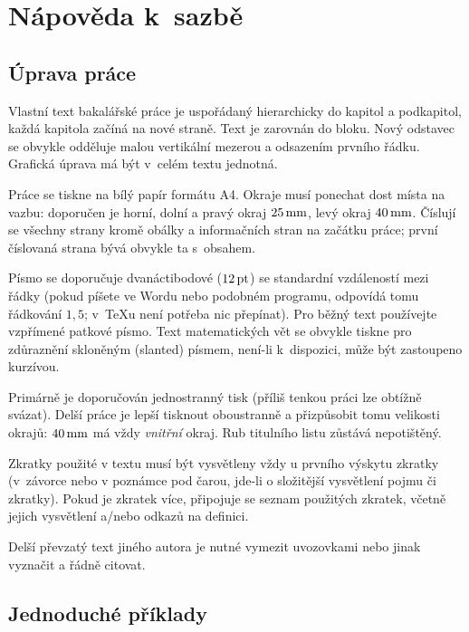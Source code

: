 
\newcommand{\uv}[1]{uvozovky #1 uvozovky}
\chapter{Nápověda k~sazbě}

\section{Úprava práce}

Vlastní text bakalářské práce je uspořádaný hierarchicky do kapitol a podkapitol,
každá kapitola začíná na nové straně. Text je zarovnán do bloku. Nový odstavec
se obvykle odděluje malou vertikální mezerou a odsazením prvního řádku. Grafická
úprava má být v~celém textu jednotná.

Práce se tiskne na bílý papír formátu A4. Okraje musí ponechat dost místa na vazbu:
doporučen je horní, dolní a pravý okraj $25\,\rm mm$, levý okraj $40\,\rm mm$.
Číslují se všechny strany kromě obálky a informačních stran na začátku práce;
první číslovaná strana bývá obvykle ta s~obsahem.

Písmo se doporučuje dvanáctibodové ($12\,\rm pt$) se standardní vzdáleností mezi řádky
(pokud píšete ve Wordu nebo podobném programu, odpovídá tomu řádkování $1,5$; v~\TeX{}u
není potřeba nic přepínat). Pro běžný text používejte vzpřímené patkové písmo.
Text matematických vět se obvykle tiskne pro zdůraznění skloněným (slanted) písmem,
není-li k~dispozici, může být zastoupeno kurzívou.

Primárně je doporučován jednostranný tisk (příliš tenkou práci lze obtížně svázat).
Delší práce je lepší tisknout oboustranně a přizpůsobit tomu velikosti okrajů:
$40\,\rm mm$ má vždy \emph{vnitřní} okraj. Rub titulního listu zůstává nepotištěný.

Zkratky použité v textu musí být vysvětleny vždy u prvního výskytu zkratky (v~závorce nebo
v poznámce pod čarou, jde-li o složitější vysvětlení pojmu či zkratky). Pokud je zkratek
více, připojuje se seznam použitých zkratek, včetně jejich vysvětlení a/nebo odkazů
na definici.

Delší převzatý text jiného autora je nutné vymezit uvozovkami nebo jinak vyznačit a řádně
citovat.

\section{Jednoduché příklady}

